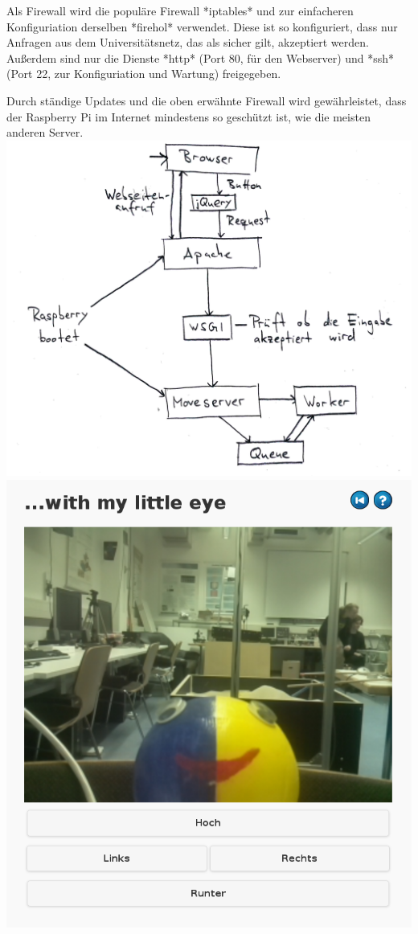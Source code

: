 \documentclass[a0,portrait]{a0poster}
\makeatletter
\newenvironment{figurehere}
  {\def\@captype{figure}}
      {}
\makeatother
\begin{document}
{\begin{minipage}{\textwidth}
\begin{multicols}{2}
	Als Firewall wird die populäre Firewall *iptables* und zur einfacheren
	Konfiguriation derselben *firehol* verwendet. Diese ist so konfiguriert,
	dass nur Anfragen aus dem Universitätsnetz, das als sicher gilt, akzeptiert
	werden. Außerdem sind nur die Dienste *http* (Port 80, für den Webserver)
	und *ssh* (Port 22, zur Konfiguriation und Wartung) freigegeben.

	Durch ständige Updates und die oben erwähnte Firewall wird gewährleistet,
	dass der Raspberry Pi im Internet mindestens so geschützt ist, wie die
	meisten anderen Server.\\
		
	\begin{figurehere}
		\centering
		\includegraphics[width=.24\textwidth]{kontrollflussdiagramm.png}
		\includegraphics[width=.24\textwidth]{websitescreenshot.png}
	\end{figurehere}


\end{multicols}
\end{minipage}}

\vspace*{0.01\textheight}
\end{document}
